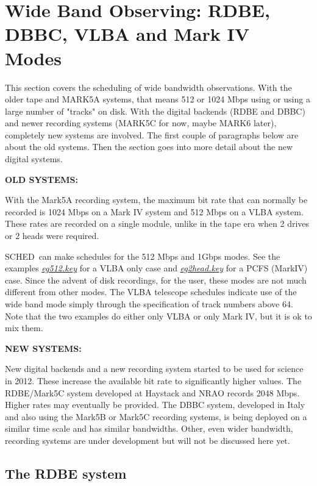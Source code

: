 \documentclass{report}
\newcommand{\schedb}{{\sc SCHED~}}
\begin{document}
\section{\label{SEC:WIDE}Wide Band Observing: RDBE, DBBC, VLBA and
Mark IV Modes}

This section covers the scheduling of wide bandwidth observations.
With the older tape and MARK5A systems, that means 512 or 1024 Mbps
using or using a large number of "tracks" on disk.  With the digital
backends (RDBE and DBBC) and newer recording systems (MARK5C for now,
maybe MARK6 later), completely new systems are involved.
The first couple of paragraphs below are about the old systems.  Then
the section goes into more detail about the new digital systems.

{\bf OLD SYSTEMS:}

With the Mark5A recording system, the maximum bit rate that can
normally be recorded is 1024 Mbps on a Mark IV system and 512 Mbps
on a VLBA system.  These rates are recorded on a single module, unlike
in the tape era when 2 drives or 2 heads were required.

\schedb can make schedules for the 512 Mbps and 1Gbps modes.  See the
examples 
{\href{examples/eg512.key}{{\sl eg512.key}}} for a
VLBA only case and 
{\href{examples/eg2head.key}{{\sl eg2head.key}}}
for a PCFS (MarkIV) case.  Since the
advent of disk recordings, for the
user, these modes are not much different from other modes.  The
VLBA telescope schedules indicate use of the wide band mode simply
through the specification of track numbers above 64.  Note that the
two examples do either only VLBA or only Mark IV, but it is ok to mix
them.

{\bf NEW SYSTEMS:}

New digital backends and a new recording system started to be used for
science in 2012.  These increase the available bit rate to
significantly higher values.  The RDBE/Mark5C system developed at
Haystack and NRAO records 2048 Mbps.  Higher rates may eventually be
provided.  The DBBC system, developed in Italy and also using the
Mark5B or Mark5C recording systems, is being deployed on a similar time
scale and has similar bandwidths.  Other, even wider bandwidth,
recording systems are under development but will not be discussed here
yet.

\subsection{\label{SSEC:RDBE}The RDBE system}
\end{document}
